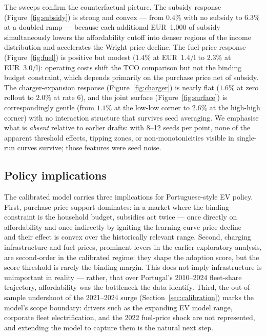 \documentclass[11pt]{article}
\begin{document}
The sweeps confirm the counterfactual picture. The subsidy response
(Figure~\ref{fig:subsidy}) is strong and convex --- from $0.4\%$ with no
subsidy to $6.3\%$ at a doubled ramp --- because each additional
EUR~1{,}000 of subsidy simultaneously lowers the affordability cutoff into
denser regions of the income distribution and accelerates the Wright
price decline. The fuel-price response (Figure~\ref{fig:fuel}) is positive
but modest ($1.4\%$ at EUR~1.4/l to $2.3\%$ at EUR~3.0/l): operating costs
shift the TCO comparison but not the binding budget constraint, which
depends primarily on the purchase price net of subsidy. The
charger-expansion response (Figure~\ref{fig:charger}) is nearly flat
($1.6\%$ at zero rollout to $2.0\%$ at rate 6), and the joint surface
(Figure~\ref{fig:surface}) is correspondingly gentle (from $1.1\%$ at the
low-low corner to $2.6\%$ at the high-high corner) with no interaction
structure that survives seed averaging. We emphasise what is \emph{absent}
relative to earlier drafts: with 8--12 seeds per point, none of the
apparent threshold effects, tipping zones, or non-monotonicities visible
in single-run curves survive; those features were seed noise.

\subsection{Policy implications}

The calibrated model carries three implications for Portuguese-style EV
policy. First, purchase-price support dominates: in a market where the
binding constraint is the household budget, subsidies act twice --- once
directly on affordability and once indirectly by igniting the
learning-curve price decline --- and their effect is convex over the
historically relevant range. Second, charging infrastructure and fuel
prices, prominent levers in the earlier exploratory analysis, are
second-order in the calibrated regime: they shape the adoption score, but
the score threshold is rarely the binding margin. This does not imply
infrastructure is unimportant in reality --- rather, that over Portugal's
2010--2024 fleet-share trajectory, affordability was the bottleneck the
data identify. Third, the out-of-sample undershoot of the 2021--2024 surge
(Section~\ref{sec:calibration}) marks the model's scope boundary: drivers
such as the expanding EV model range, corporate fleet electrification, and
the 2022 fuel-price shock are not represented, and extending the model to
capture them is the natural next step.
\end{document}
